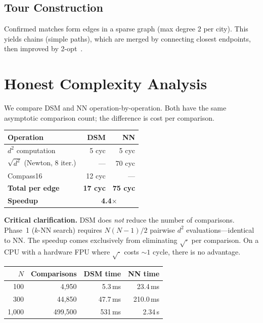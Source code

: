 \documentclass[11pt,a4paper,twocolumn]{article}
\begin{document}
\subsection{Tour Construction}

Confirmed matches form edges in a sparse graph (max degree 2 per city). This yields chains (simple paths), which are merged by connecting closest endpoints, then improved by 2-opt~\cite{croes1958}.

\FloatBarrier
\section{Honest Complexity Analysis}\label{sec:complexity}

We compare DSM and NN operation-by-operation. Both have the same asymptotic comparison count; the difference is cost per comparison.

\smallskip
\noindent\begin{minipage}{\columnwidth}
\centering\small
{}\label{tab:cycles}
\smallskip
\begin{tabular}{@{}lrr@{}}
\toprule
Operation & DSM & NN \\
\midrule
$d^2$ computation & 5 cyc & 5 cyc \\
$\sqrt{d^2}$ (Newton, 8 iter.) & --- & 70 cyc \\
Compass16 & 12 cyc & --- \\
\midrule
\textbf{Total per edge} & \textbf{17 cyc} & \textbf{75 cyc} \\
\textbf{Speedup} & \multicolumn{2}{c}{\textbf{4.4$\times$}} \\
\bottomrule
\end{tabular}
\end{minipage}
\medskip

\textbf{Critical clarification.} DSM does \textit{not} reduce the number of comparisons. Phase~1 ($k$-NN search) requires $N(N{-}1)/2$ pairwise $d^2$ evaluations---identical to NN. The speedup comes exclusively from eliminating $\sqrt{\cdot}$ per comparison. On a CPU with a hardware FPU where $\sqrt{\cdot}$ costs ${\sim}1$ cycle, there is no advantage.

\smallskip
\noindent\begin{minipage}{\columnwidth}
\centering\small
{}\label{tab:wallclock}
\smallskip
\begin{tabular}{@{}rrrr@{}}
\toprule
$N$ & Comparisons & DSM time & NN time \\
\midrule
100 & 4,950 & 5.3\,ms & 23.4\,ms \\
300 & 44,850 & 47.7\,ms & 210.0\,ms \\
1,000 & 499,500 & 531\,ms & 2.34\,s \\
\bottomrule
\end{tabular}
\end{minipage}
\medskip
\end{document}
